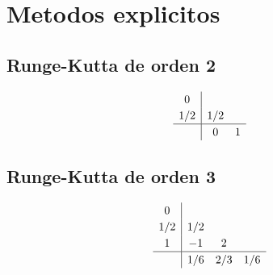     \vspace{-10pt}

    \section*{Metodos explicitos}

    \vspace{-20pt}

    \noindent\begin{minipage}[t]{.5\linewidth}
        \subsection{Runge-Kutta de orden 2}
            \begin{equation}\label{eq:rk2}
                \renewcommand\arraystretch{1.2}
                \begin{array}{c|cc}
                0\\
                1/2 & 1/2\\
                \hline
                & 0 & 1
                \end{array}
            \end{equation}
    \end{minipage}%
    \begin{minipage}[t]{.5\linewidth}
        \subsection{Runge-Kutta de orden 3}
            \begin{equation}\label{eq:rk3}
                \renewcommand\arraystretch{1.2}
                \begin{array}{c|ccc}
                0\\
                1/2 & 1/2\\
                1 & -1 & 2\\
                \hline
                & 1/6& 2/3 & 1/6
                \end{array}
            \end{equation}
    \end{minipage}
    
    \vfill
    
